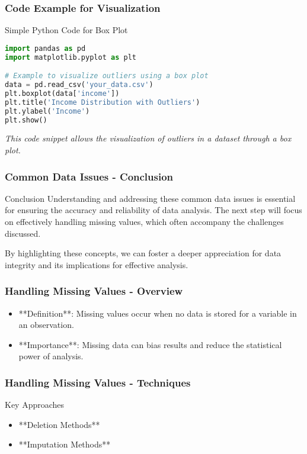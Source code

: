 \documentclass[aspectratio=169]{beamer}
\begin{document}
\begin{frame}[fragile]
    \frametitle{Code Example for Visualization}
    \begin{block}{Simple Python Code for Box Plot}
        \begin{lstlisting}[language=Python]
import pandas as pd
import matplotlib.pyplot as plt

# Example to visualize outliers using a box plot
data = pd.read_csv('your_data.csv')
plt.boxplot(data['income'])
plt.title('Income Distribution with Outliers')
plt.ylabel('Income')
plt.show()
        \end{lstlisting}
    \end{block}
    
    \textit{This code snippet allows the visualization of outliers in a dataset through a box plot.}
\end{frame}

\begin{frame}[fragile]
    \frametitle{Common Data Issues - Conclusion}
    \begin{block}{Conclusion}
        Understanding and addressing these common data issues is essential for ensuring the accuracy and reliability of data analysis. The next step will focus on effectively handling missing values, which often accompany the challenges discussed.
    \end{block}
    
    By highlighting these concepts, we can foster a deeper appreciation for data integrity and its implications for effective analysis.
\end{frame}

\begin{frame}[fragile]
    \frametitle{Handling Missing Values - Overview}
    \begin{itemize}
        \item **Definition**: Missing values occur when no data is stored for a variable in an observation.
        \item **Importance**: Missing data can bias results and reduce the statistical power of analysis.
    \end{itemize}
\end{frame}

\begin{frame}[fragile]
    \frametitle{Handling Missing Values - Techniques}
    \begin{block}{Key Approaches}
        \begin{itemize}
            \item **Deletion Methods**
            \item **Imputation Methods**
        \end{itemize}
    \end{block}
\end{frame}
\end{document}
